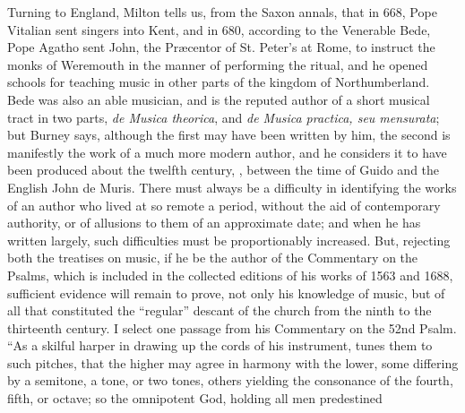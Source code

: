 Turning to England, Milton tells us, from the Saxon annals, that in 668, 
Pope Vitalian sent singers into Kent, and in 680, according to the Venerable
Bede, Pope Agatho sent John, the Præcentor of St. Peter’s at Rome, to
instruct the monks of Weremouth in the manner of performing the ritual, and he
opened schools for teaching music in other parts of the kingdom of Northumberland.
Bede was also an able musician, and is the reputed author of a short
musical tract in two parts, \textit{de Musica theorica}, and \textit{de Musica practica, seu mensurata};
but Burney says, although the first may have been written by him, the
second is manifestly the work of a much more modern author, and he considers it
to have been produced about the twelfth century, \ie, between the time of Guido
and the English John de Muris. There must always be a difficulty in identifying
the works of an author who lived at so remote a period, without the aid of
contemporary authority, or of allusions to them of an approximate date; and when
he has written largely, such difficulties must be proportionably increased. But,
rejecting both the treatises on music, if he be the author of the Commentary on
the Psalms, which is included in the collected editions of his works of 1563
and 1688, sufficient evidence will remain to prove, not only his knowledge of
music, but of all that constituted the “regular” descant of the church from the
ninth to the thirteenth century. I select one passage from his Commentary on
the 52nd Psalm. “As a skilful harper in drawing up the cords of his instrument,
tunes them to such pitches, that the higher may agree in harmony with the lower,
some differing by a semitone, a tone, or two tones, others yielding the consonance
of the fourth, fifth, or octave; so the omnipotent God, holding all men predestined
